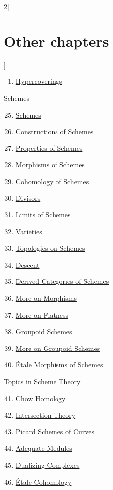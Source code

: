 \begin{multicols}{2}[\section{Other chapters}]
\begin{enumerate}
\item \hyperref[hypercovering-section-phantom]{Hypercoverings}
\end{enumerate}
Schemes
\begin{enumerate}
\setcounter{enumi}{24}
\item \hyperref[schemes-section-phantom]{Schemes}
\item \hyperref[constructions-section-phantom]{Constructions of Schemes}
\item \hyperref[properties-section-phantom]{Properties of Schemes}
\item \hyperref[morphisms-section-phantom]{Morphisms of Schemes}
\item \hyperref[coherent-section-phantom]{Cohomology of Schemes}
\item \hyperref[divisors-section-phantom]{Divisors}
\item \hyperref[limits-section-phantom]{Limits of Schemes}
\item \hyperref[varieties-section-phantom]{Varieties}
\item \hyperref[topologies-section-phantom]{Topologies on Schemes}
\item \hyperref[descent-section-phantom]{Descent}
\item \hyperref[perfect-section-phantom]{Derived Categories of Schemes}
\item \hyperref[more-morphisms-section-phantom]{More on Morphisms}
\item \hyperref[flat-section-phantom]{More on Flatness}
\item \hyperref[groupoids-section-phantom]{Groupoid Schemes}
\item \hyperref[more-groupoids-section-phantom]{More on Groupoid Schemes}
\item \hyperref[etale-section-phantom]{\'Etale Morphisms of Schemes}
\end{enumerate}
Topics in Scheme Theory
\begin{enumerate}
\setcounter{enumi}{40}
\item \hyperref[chow-section-phantom]{Chow Homology}
\item \hyperref[intersection-section-phantom]{Intersection Theory}
\item \hyperref[pic-section-phantom]{Picard Schemes of Curves}
\item \hyperref[adequate-section-phantom]{Adequate Modules}
\item \hyperref[dualizing-section-phantom]{Dualizing Complexes}
\item \hyperref[etale-cohomology-section-phantom]{\'Etale Cohomology}

\end{enumerate}
\end{multicols}

